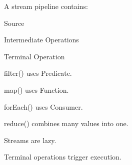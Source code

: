 \documentclass[11pt,a4paper]{book}
\begin{document}

\begin{rosettarule}

A stream pipeline contains:

Source

Intermediate Operations

Terminal Operation

\end{rosettarule}


\begin{rosettarule}

filter() uses Predicate.

\end{rosettarule}


\begin{rosettarule}

map() uses Function.

\end{rosettarule}


\begin{rosettarule}

forEach() uses Consumer.

\end{rosettarule}


\begin{rosettarule}

reduce() combines many values into one.

\end{rosettarule}


\begin{rosettarule}

Streams are lazy.

\end{rosettarule}


\begin{rosettarule}

Terminal operations trigger execution.

\end{rosettarule}
\end{document}
